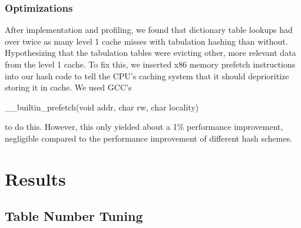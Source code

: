 \documentclass[11pt]{article}
\begin{document}
\subsubsection{Optimizations}

After implementation and profiling, we found that dictionary table lookups had
over twice as many level 1 cache misses with tabulation hashing than without.
Hypothesizing that the tabulation tables were evicting other, more relevant
data from the level 1 cache.  To fix this, we inserted x86 memory prefetch
instructions into our hash code to tell the CPU's caching system that it should
deprioritize storing it in cache.  We used GCC's
\begin{tt}\_\_builtin\_prefetch(void \*addr, char rw, char locality)\end{tt}
to do this.  However, this only yielded about a 1\% performance improvement,
negligible compared to the performance improvement of different hash schemes.

\section{Results}

\subsection{Table Number Tuning}
\end{document}
